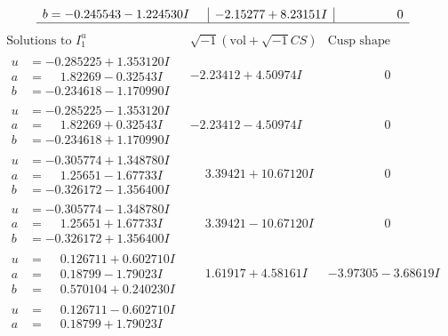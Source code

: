 \documentclass[1p]{elsarticle_modified}
\theoremstyle{definition}
\newcommand{\I}{\sqrt{-1}}
\begin{document}
$$\begin{array}{c|c|c}
\begin{aligned}
b &= -0.245543 - 1.224530 I\end{aligned}
 & -2.15277 + 8.23151 I & \phantom{-0.000000 } 0\\
 \hline 
 \end{array}$$\newpage$$\begin{array}{c|c|c}  
\text{Solutions to }I^u_{1}& \I (\text{vol} + \sqrt{-1}CS) & \text{Cusp shape}\\
 \hline 
\begin{aligned}
u &= -0.285225 + 1.353120 I \\
a &= \phantom{-}1.82269 - 0.32543 I \\
b &= -0.234618 - 1.170990 I\end{aligned}
 & -2.23412 + 4.50974 I & \phantom{-0.000000 } 0 \\ \hline\begin{aligned}
u &= -0.285225 - 1.353120 I \\
a &= \phantom{-}1.82269 + 0.32543 I \\
b &= -0.234618 + 1.170990 I\end{aligned}
 & -2.23412 - 4.50974 I & \phantom{-0.000000 } 0 \\ \hline\begin{aligned}
u &= -0.305774 + 1.348780 I \\
a &= \phantom{-}1.25651 - 1.67733 I \\
b &= -0.326172 - 1.356400 I\end{aligned}
 & \phantom{-}3.39421 + 10.67120 I & \phantom{-0.000000 } 0 \\ \hline\begin{aligned}
u &= -0.305774 - 1.348780 I \\
a &= \phantom{-}1.25651 + 1.67733 I \\
b &= -0.326172 + 1.356400 I\end{aligned}
 & \phantom{-}3.39421 - 10.67120 I & \phantom{-0.000000 } 0 \\ \hline\begin{aligned}
u &= \phantom{-}0.126711 + 0.602710 I \\
a &= \phantom{-}0.18799 - 1.79023 I \\
b &= \phantom{-}0.570104 + 0.240230 I\end{aligned}
 & \phantom{-}1.61917 + 4.58161 I & -3.97305 - 3.68619 I \\ \hline\begin{aligned}
u &= \phantom{-}0.126711 - 0.602710 I \\
a &= \phantom{-}0.18799 + 1.79023 I \\

\end{aligned}
\end{array}$$
\end{document}
